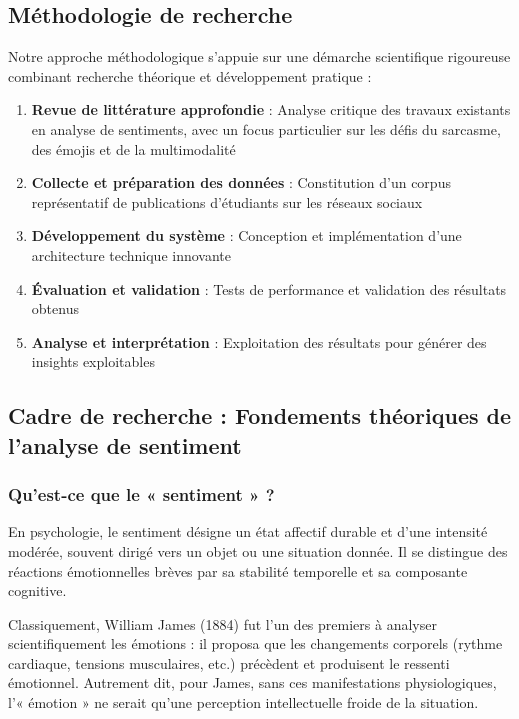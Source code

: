 \subsection{Méthodologie de recherche}

Notre approche méthodologique s'appuie sur une démarche scientifique rigoureuse combinant recherche théorique et développement pratique :

\begin{enumerate}
    \item \textbf{Revue de littérature approfondie} : Analyse critique des travaux existants en analyse de sentiments, avec un focus particulier sur les défis du sarcasme, des émojis et de la multimodalité
    \item \textbf{Collecte et préparation des données} : Constitution d'un corpus représentatif de publications d'étudiants sur les réseaux sociaux
    \item \textbf{Développement du système} : Conception et implémentation d'une architecture technique innovante
    \item \textbf{Évaluation et validation} : Tests de performance et validation des résultats obtenus
    \item \textbf{Analyse et interprétation} : Exploitation des résultats pour générer des insights exploitables
\end{enumerate}

\subsection{Cadre de recherche : Fondements théoriques de l'analyse de sentiment}

\subsubsection{Qu'est-ce que le « sentiment » ?}

En psychologie, le sentiment désigne un état affectif durable et d'une intensité modérée, souvent dirigé vers un objet ou une situation donnée. Il se distingue des réactions émotionnelles brèves par sa stabilité temporelle et sa composante cognitive.

Classiquement, William James (1884) fut l'un des premiers à analyser scientifiquement les émotions : il proposa que les changements corporels (rythme cardiaque, tensions musculaires, etc.) précèdent et produisent le ressenti émotionnel. Autrement dit, pour James, sans ces manifestations physiologiques, l'« émotion » ne serait qu'une perception intellectuelle froide de la situation.

